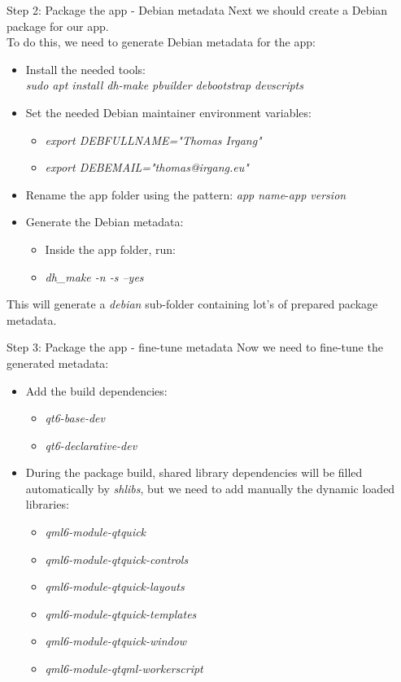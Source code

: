 \documentclass{beamer}
\begin{document}
\begin{frame}{Step 2: Package the app - Debian metadata}
	Next we should create a Debian package for our app.\\
	To do this, we need to generate Debian metadata for the app:
	\begin{itemize}
		\item Install the needed tools:\\
		\emph{sudo apt install dh-make pbuilder debootstrap devscripts}
		\item Set the needed Debian maintainer environment variables:
		\begin{itemize}
			\item \emph{export DEBFULLNAME="Thomas Irgang"}
			\item \emph{export DEBEMAIL="thomas@irgang.eu"}
		\end{itemize}
		\item Rename the app folder using the pattern: \emph{app name}-\emph{app version}
		\item Generate the Debian metadata:
		\begin{itemize}
			\item Inside the app folder, run:
			\item \emph{dh\_make -n -s --yes}
		\end{itemize}
	\end{itemize}
	This will generate a \emph{debian} sub-folder containing lot's of prepared package metadata.
\end{frame}

\begin{frame}{Step 3: Package the app - fine-tune metadata}
	Now we need to fine-tune the generated metadata:
	\begin{itemize}
		\item Add the build dependencies:
		\begin{itemize}
			\item \emph{qt6-base-dev}
			\item \emph{qt6-declarative-dev}
		\end{itemize}
		\item During the package build, shared library dependencies will be filled automatically by \emph{shlibs}, but we need to add manually the dynamic loaded libraries:
		\begin{itemize}
			\item \emph{qml6-module-qtquick}
			\item \emph{qml6-module-qtquick-controls}
			\item \emph{qml6-module-qtquick-layouts}
			\item \emph{qml6-module-qtquick-templates}
			\item \emph{qml6-module-qtquick-window}
			\item \emph{qml6-module-qtqml-workerscript}
		\end{itemize}
	\end{itemize}
\end{frame}
\end{document}
